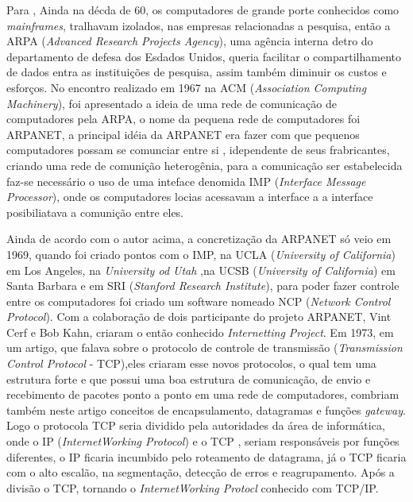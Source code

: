 \par Para , Ainda na décda de 60, os computadores de
grande porte conhecidos como \textit{mainframes}, tralhavam izolados, nas
empresas relacionadas a pesquisa, então a ARPA (\textit{Advanced Research
Projects Agency}), uma agência interna detro do departamento de defesa dos
Esdados Unidos, queria facilitar o compartilhamento de dados entra as
instituições de pesquisa, assim também diminuir os custos e esforços.
No encontro realizado em 1967 na ACM (\textit{Association Computing
Machinery}), foi apresentado a ideia de uma rede de comunicação de computadores
pela ARPA, o nome da pequena rede de computadores foi ARPANET, a principal idéia
da ARPANET era fazer com que pequenos computadores possam se comunciar entre si
, idependente de seus frabricantes, criando uma rede de comunição heterogênia,
para a comunicação ser estabelecida faz-se necessário o uso de uma inteface
denomida IMP (\textit{Interface Message Processor}), onde os computadores locias
acessavam a interface a a interface posibiliatava a comunição entre eles.

\par Ainda de acordo com o autor acima, a concretização da ARPANET só veio em
1969, quando foi criado pontos com o IMP, na UCLA (\textit{University of
California}) em Los Angeles, na \textit{University od Utah} ,na UCSB
(\textit{University of California}) em Santa Barbara e em SRI
(\textit{Stanford Research Institute}), para poder fazer controle
entre os computadores foi criado um software nomeado NCP (\textit{Network
Control Protocol}). Com a colaboração de dois participante do projeto ARPANET,
Vint Cerf e Bob Kahn, criaram o então conhecido \textit{Internetting Project}. 
Em 1973, em um artigo, que falava sobre o protocolo de controle de
transmissão (\textit{Transmission Control Protocol} - TCP),eles criaram esse
novos protocolos, o qual tem uma estrutura forte e que possui uma boa estrutura
de comunicação, de envio e recebimento de pacotes ponto a ponto em uma rede de
computadores, combriam também neste artigo conceitos de encapsulamento,
datagramas e funções \textit{gateway}. Logo o protocola TCP seria dividido pela
autoridades da área de informática, onde o IP (\textit{InternetWorking
Protocol}) e o TCP , seriam responsáveis por funções diferentes, o IP ficaria
incumbido pelo roteamento de datagrama, já o TCP ficaria com o alto escalão, na
segmentação, detecção de erros e reagrupamento. Após a divisão o TCP, tornando o \textit{InternetWorking
Protocl} conhecido com TCP/IP.

